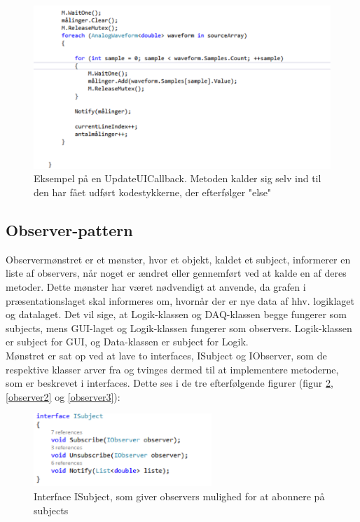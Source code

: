 \begin{figure}[H]
	\centering
	\includegraphics[width=1.1\textwidth]{Figurer/SoftwareImplementering/mutex}
	\caption{Eksempel på en UpdateUICallback. Metoden kalder sig selv ind til den har fået udført kodestykkerne, der efterfølger "else"\ }
	\label{mutex}
\end{figure}


\subsection{Observer-pattern}
Observermønstret er et mønster, hvor et objekt, kaldet et subject, informerer en liste af observers, når noget er ændret eller gennemført ved at kalde en af deres metoder. Dette mønster har været nødvendigt at anvende, da grafen i præsentationslaget skal informeres om, hvornår der er nye data af hhv. logiklaget og datalaget. Det vil sige, at Logik-klassen og DAQ-klassen begge fungerer som subjects, mens GUI-laget og Logik-klassen fungerer som observers. Logik-klassen er subject for GUI, og Data-klassen er subject for Logik.\\
Mønstret er sat op ved at lave to interfaces, ISubject og IObserver, som de respektive klasser arver fra og tvinges dermed til at implementere metoderne, som er beskrevet i interfaces. Dette ses i de tre efterfølgende figurer (figur \ref{observer1},\ref{observer2} og \ref{observer3}):

\begin{figure}[H]
	\centering
	\includegraphics[width=0.6\textwidth]{Figurer/SoftwareImplementering/observer1}
	\caption{Interface ISubject, som giver observers mulighed for at abonnere på subjects}
	\label{observer1}
\end{figure}

